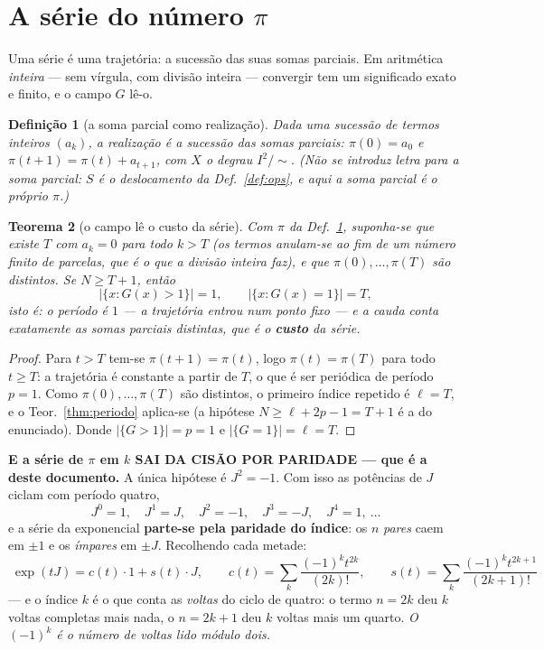 \documentclass[11pt,a4paper]{article}
\newtheorem{teorema}{Teorema}
\newtheorem{definicao}[teorema]{Definição}
\begin{document}
\section{A série do número $\pi$}\label{sec:serie}

\noindent Uma série é uma trajetória: a sucessão das suas somas parciais. Em
aritmética \emph{inteira} --- sem vírgula, com divisão inteira --- convergir tem
um significado exato e finito, e o campo $G$ lê-o.

\begin{definicao}[a soma parcial como realização]\label{def:serie}
Dada uma sucessão de termos inteiros $(a_k)$, a realização \emph{é} a sucessão
das somas parciais: $\pi(0)=a_0$ e $\pi(t+1)=\pi(t)+a_{t+1}$, com $X$ o degrau
$I^{2}/{\sim}$. (Não se introduz letra para a soma parcial: $S$ é o
deslocamento da Def.~\ref{def:ops}, e aqui a soma parcial é o próprio $\pi$.)
\end{definicao}

\begin{teorema}[o campo lê o custo da série]\label{thm:serie}
Com $\pi$ da Def.~\ref{def:serie}, suponha-se que existe $T$ com $a_k=0$ para
todo $k>T$ (os termos anulam-se ao fim de um número finito de parcelas, que é
o que a divisão inteira faz), e que $\pi(0),\dots,\pi(T)$ são distintos. Se $N\ge T+1$, então
\[
\bigl\lvert\{x:G(x)>1\}\bigr\rvert=1,\qquad
\bigl\lvert\{x:G(x)=1\}\bigr\rvert=T,
\]
isto é: o período é $1$ --- a trajetória entrou num ponto fixo --- e a cauda
conta exatamente as somas parciais distintas, que é o \textbf{custo} da série.
\end{teorema}

\begin{proof}
Para $t>T$ tem-se $\pi(t+1)=\pi(t)$, logo $\pi(t)=\pi(T)$ para todo $t\ge T$: a
trajetória é constante a partir de $T$, o que é ser periódica de período $p=1$.
Como $\pi(0),\dots,\pi(T)$ são distintos, o primeiro índice repetido é $\ell=T$, e o
Teor.~\ref{thm:periodo} aplica-se (a hipótese $N\ge\ell+2p-1=T+1$ é a do
enunciado). Donde $\lvert\{G>1\}\rvert=p=1$ e $\lvert\{G=1\}\rvert=\ell=T$.
\end{proof}

\medskip\noindent\textbf{E a série de $\pi$ em $k$ SAI DA CISÃO POR PARIDADE
--- que é a deste documento.} A única hipótese é $J^{2}=-1$. Com isso as potências
de $J$ ciclam com período quatro,
\[
J^{0}=1,\quad J^{1}=J,\quad J^{2}=-1,\quad J^{3}=-J,\quad J^{4}=1,\ \dots
\]
e a série da exponencial \textbf{parte-se pela paridade do índice}: os $n$
\emph{pares} caem em $\pm1$ e os \emph{ímpares} em $\pm J$. Recolhendo cada
metade:
\[
\boxed{\;
\exp(tJ)=c(t)\cdot 1+s(t)\cdot J,\qquad
c(t)=\sum_{k}\frac{(-1)^{k}t^{2k}}{(2k)!},\qquad
s(t)=\sum_{k}\frac{(-1)^{k}t^{2k+1}}{(2k+1)!}\;}
\]
--- e o índice $k$ é o que conta as \emph{voltas} do ciclo de quatro: o termo
$n=2k$ deu $k$ voltas completas mais nada, o $n=2k+1$ deu $k$ voltas mais um
quarto. \emph{O $(-1)^{k}$ é o número de voltas lido módulo dois.}
\end{document}
